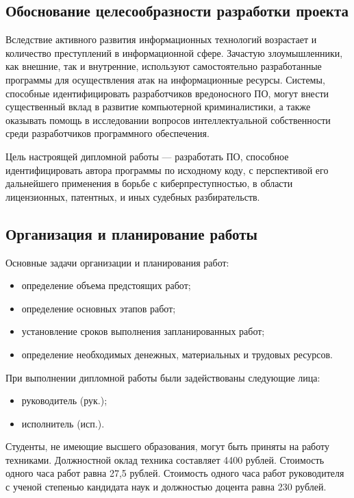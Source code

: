 \subsection{Обоснование целесообразности разработки проекта}

Вследствие активного развития информационных технологий возрастает и количество преступлений в информационной сфере.
Зачастую злоумышленники, как внешние, так и внутренние, используют самостоятельно разработанные программы для осуществления 
атак на информационные ресурсы.
Системы, способные идентифицировать разработчиков вредоносного ПО, могут внести существенный вклад в развитие компьютерной
криминалистики, а также оказывать помощь в исследовании вопросов интеллектуальной собственности среди разработчиков программного
обеспечения.

Цель настроящей дипломной работы --- разработать ПО, способное идентифицировать автора программы по исходному коду, с перспективой его
дальнейшего применения в борьбе с киберпреступностью, в области лицензионных, патентных, и иных судебных разбирательств.


\subsection{Организация и планирование работы}

Основные задачи организации и планирования работ:
\begin{itemize}
 \item определение объема предстоящих работ;
 \item определение основных этапов работ;
 \item установление сроков выполнения запланированных работ;
 \item определение необходимых денежных, материальных и трудовых ресурсов.
\end{itemize}


При выполнении дипломной работы были задействованы следующие лица:
\begin{itemize}
 \item руководитель (рук.);
 \item исполнитель (исп.).
\end{itemize}

Студенты, не имеющие высшего образования, могут быть приняты на
работу техниками. Должностной оклад техника составляет 4400 рублей.
Стоимость одного часа работ равна 27,5 рублей.
Стоимость одного часа работ руководителя с ученой степенью кандидата наук и должностью доцента
равна 230 рублей.   

